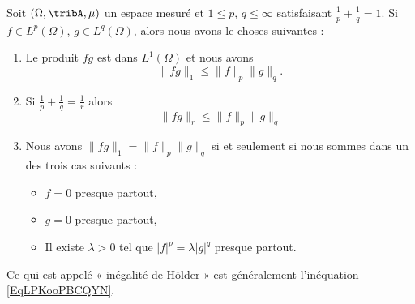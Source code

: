 \begin{proposition}       \label{ProptYqspT}
	Soit \(  (\Omega,\tribA,\mu) \) un espace mesuré et \( 1\leq p\), \( q\leq\infty\) satisfaisant \( \frac{1}{ p }+\frac{1}{ q }=1\). Si \( f\in L^p(\Omega)\), \( g\in L^q(\Omega)\), alors nous avons le choses suivantes :

	\begin{enumerate}
		\item       \label{ITEMooNDKPooRKdmgS}
		      Le produit \( fg\) est dans \( L^1(\Omega)\) et nous avons
		      \begin{equation}    \label{EqLPKooPBCQYN}
			      \| fg \|_1\leq \| f \|_p\| g \|_q.
		      \end{equation}
		\item           \label{ITEMooQHLPooRWWMOP}
		      Si \( \frac{1}{ p }+\frac{1}{ q }=\frac{1}{ r }\) alors
		      \begin{equation}    \label{EqAVZooFNyzmT}
			      \| fg \|_r\leq \| f \|_p\| g \|_q
		      \end{equation}
		\item       \label{ITEMooBOYJooRkiAqJ}
		      Nous avons \( \| fg \|_1=\| f \|_p\| g \|_q\) si et seulement si nous sommes dans un des trois cas suivants :
		      \begin{itemize}
			      \item \( f=0\) presque partout,
			      \item \( g=0\) presque partout,
			      \item Il existe \( \lambda> 0\) tel que \( | f |^p=\lambda| g |^q\) presque partout.
		      \end{itemize}
	\end{enumerate}
\end{proposition}
Ce qui est appelé « inégalité de Hölder » est généralement l'inéquation \eqref{EqLPKooPBCQYN}.

